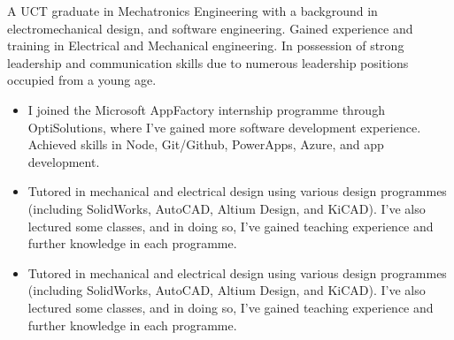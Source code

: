 \documentclass[10pt,a4paper]{altacv}
\begin{document}

\begin{fullwidth}
\makecvheader
\end{fullwidth}

\begin{fullwidth}
{A UCT graduate in Mechatronics Engineering with a background in electromechanical design, and software engineering. Gained experience and training in Electrical and Mechanical engineering. In possession of strong leadership and communication skills due to numerous leadership positions occupied from a young age.}
\end{fullwidth}




\begin{itemize}
\item I joined the Microsoft AppFactory internship programme through OptiSolutions, where I’ve gained more software development experience. Achieved skills in Node, Git/Github, PowerApps, Azure, and app development.  
\end{itemize}


\divider


\begin{itemize}
\item Tutored in mechanical and electrical design using various design programmes (including SolidWorks, AutoCAD, Altium Design, and KiCAD). I’ve also lectured some classes, and in doing so, I’ve gained teaching experience and further knowledge in each programme.
\item Tutored in mechanical and electrical design using various design programmes (including SolidWorks, AutoCAD, Altium Design, and KiCAD). I’ve also lectured some classes, and in doing so, I’ve gained teaching experience and further knowledge in each programme.


\end{itemize}
\end{document}
